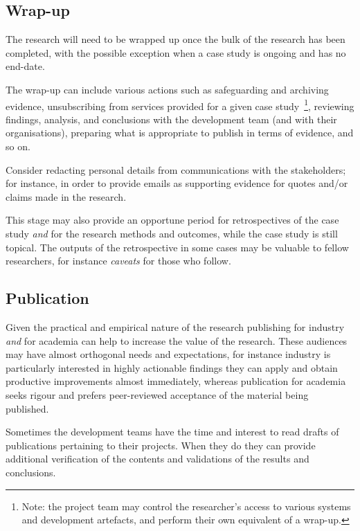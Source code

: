 \subsection{Wrap-up}
The research will need to be wrapped up once the bulk of the research has been completed, with the possible exception when a case study is ongoing and has no end-date. 

The wrap-up can include various actions such as safeguarding and archiving evidence, unsubscribing from services provided for a given case study~\footnote{Note: the project team may control the researcher's access to various systems and development artefacts, and perform their own equivalent of a wrap-up.}, reviewing findings, analysis, and conclusions with the development team (and with their organisations), preparing what is appropriate to publish in terms of evidence, and so on.

Consider redacting personal details from communications with the stakeholders; for instance, in order to provide emails as supporting evidence for quotes and/or claims made in the research.

This stage may also provide an opportune period for retrospectives of the case study \textit{and} for the research methods and outcomes, while the case study is still topical. The outputs of the retrospective in some cases may be valuable to fellow researchers, for instance \emph{caveats} for those who follow. 

\subsection{Publication}
Given the practical and empirical nature of the research publishing for industry \emph{and} for academia can help to increase the value of the research. These audiences may have almost orthogonal needs and expectations, for instance industry is particularly interested in highly actionable findings they can apply and obtain productive improvements almost immediately, whereas publication for academia seeks rigour and prefers peer-reviewed acceptance of the material being published.

Sometimes the development teams have the time and interest to read drafts of publications pertaining to their projects. When they do they can provide additional verification of the contents and validations of the results and conclusions.

